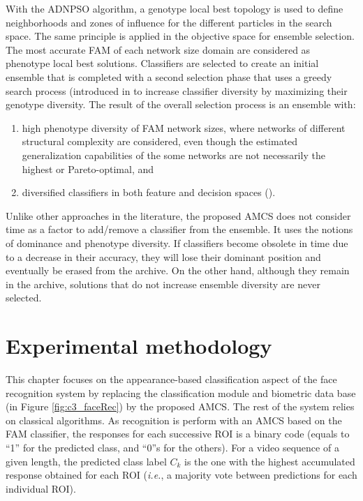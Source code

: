 With the ADNPSO algorithm, a genotype local best topology is used to define neighborhoods and zones of influence for the different particles in the search space.
The same principle is applied in the objective space for ensemble selection.
The most accurate FAM of each network size domain are considered as phenotype local best solutions.
Classifiers are selected to create an initial ensemble that is completed with a second selection phase that uses a greedy search process (introduced in \cite{connolly11} to increase classifier diversity by maximizing their genotype diversity.
The result of the overall selection process is an ensemble with: 
\begin{enumerate}
	\item high phenotype diversity of FAM network sizes, where networks of different structural complexity are considered, even though the estimated generalization capabilities of the some networks are not necessarily the highest or Pareto-optimal, and 
	\item diversified classifiers in both feature and decision spaces 
			  (\cite{connolly11}).
\end{enumerate}

Unlike other approaches in the literature, the proposed AMCS does not consider time as a factor to add/remove a classifier from the ensemble.
It uses the notions of dominance and phenotype diversity.
If classifiers become obsolete in time due to a decrease in their accuracy, they will lose their dominant position and eventually be erased from the archive.
On the other hand, although they remain in the archive, solutions that do not increase ensemble diversity are never selected.

\section{Experimental methodology}
\label{sec:c3_methodology}

This chapter focuses on the appearance-based classification aspect of the face recognition system by replacing the classification module and biometric data base (in Figure \ref{fig:c3_faceRec}) by the proposed AMCS.
The rest of the system relies on classical algorithms.
As recognition is perform with an AMCS based on the FAM classifier, the responses for each successive ROI is a binary code (equals to ``1'' for the predicted class, and ``0''s for the others).
For a video sequence of a given length, the predicted class label $C_k$ is the one with the highest accumulated response obtained for each ROI (\emph{i.e.}, a majority vote between predictions for each individual ROI).

